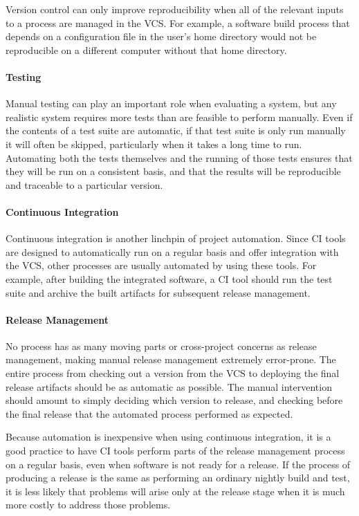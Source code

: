 Version control can only improve reproducibility when all of the
relevant inputs to a process are managed in the VCS. For example, a
software build process that depends on a configuration file in the
user's home directory would not be reproducible on a different
computer without that home directory.

\paragraph{Testing}

Manual testing can play an important role when evaluating a system,
but any realistic system requires more tests than are feasible to
perform manually. Even if the contents of a test suite are automatic,
if that test suite is only run manually it will often be skipped,
particularly when it takes a long time to run. Automating both the
tests themselves and the running of those tests ensures that they will
be run on a consistent basis, and that the results will be
reproducible and traceable to a particular version.

\paragraph{Continuous Integration}

Continuous integration is another linchpin of project
automation. Since CI tools are designed to automatically run on a
regular basis and offer integration with the VCS, other processes are
usually automated by using these tools. For example, after building
the integrated software, a CI tool should run the test suite and
archive the built artifacts for subsequent release management.

\paragraph{Release Management}

No process has as many moving parts or cross-project concerns as
release management, making manual release management extremely
error-prone. The entire process from checking out a version from the
VCS to deploying the final release artifacts should be as automatic as
possible. The manual intervention should amount to simply deciding
which version to release, and checking before the final release that
the automated process performed as expected.

Because automation is inexpensive when using continuous integration,
it is a good practice to have CI tools perform parts of the release
management process on a regular basis, even when software is not ready
for a release. If the process of producing a release is the same as
performing an ordinary nightly build and test, it is less likely that
problems will arise only at the release stage when it is much more
costly to address those problems.

